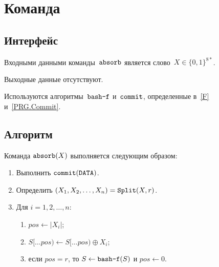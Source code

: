 \section{Команда }\label{PRG.Absorb}

\subsection{Интерфейс}\label{PRG.Absorb.IFace}

Входными данными команды~$\texttt{absorb}$ является слово~$X\in\{0,1\}^{8*}$.

Выходные данные отсутствуют.

Используются алгоритмы~$\texttt{bash-f}$ и~$\texttt{commit}$, 
определенные в~\ref{F} и~\ref{PRG.Commit}.

\subsection{Алгоритм}\label{PRG.Absorb.Alg}

Команда $\texttt{absorb}(X)$ выполняется следующим образом:
\begin{enumerate}
\item
Выполнить 
$\texttt{commit}(\texttt{DATA})$.
\item
Определить $(X_1,X_2,\ldots,X_n)=\mathop{\texttt{Split}}\nolimits(X,r)$.
\item
Для $i=1,2,\ldots,n$:
\begin{enumerate}
\item
$pos\leftarrow |X_i|$;
\item
$S[\dots pos)\leftarrow S[\dots pos)\oplus X_i$;
\item
если $pos=r$, то 
$S\leftarrow\texttt{bash-f}(S)$ и $pos\leftarrow 0$.
\end{enumerate}
\end{enumerate}

